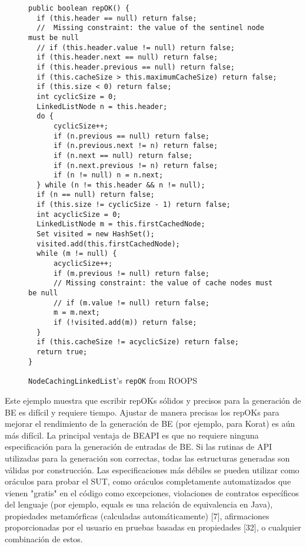 \begin{figure}[!thb]
\begin{lstlisting}
public boolean repOK() {
  if (this.header == null) return false;
  //  Missing constraint: the value of the sentinel node must be null  
  // if (this.header.value != null) return false;
  if (this.header.next == null) return false;
  if (this.header.previous == null) return false;
  if (this.cacheSize > this.maximumCacheSize) return false;
  if (this.size < 0) return false;
  int cyclicSize = 0;
  LinkedListNode n = this.header;
  do {
      cyclicSize++;
      if (n.previous == null) return false;
      if (n.previous.next != n) return false;
      if (n.next == null) return false;
      if (n.next.previous != n) return false;
      if (n != null) n = n.next;
  } while (n != this.header && n != null);
  if (n == null) return false;
  if (this.size != cyclicSize - 1) return false;
  int acyclicSize = 0;
  LinkedListNode m = this.firstCachedNode;
  Set visited = new HashSet();
  visited.add(this.firstCachedNode);
  while (m != null) {
      acyclicSize++;
      if (m.previous != null) return false;
      // Missing constraint: the value of cache nodes must be null
      // if (m.value != null) return false;
      m = m.next;
      if (!visited.add(m)) return false;
  }
  if (this.cacheSize != acyclicSize) return false;
  return true;
}
\end{lstlisting}
\caption{\texttt{NodeCachingLinkedList}'s \texttt{repOK} from \textsf{ROOPS}}
\label{fig:NCL-repOK}
\end{figure}

Este ejemplo muestra que escribir repOKs sólidos y precisos para la generación de BE es difícil y requiere tiempo. Ajustar de manera precisas los repOKs para mejorar el rendimiento de la generación de BE (por ejemplo, para Korat) es aún más difícil. La principal ventaja de BEAPI es que no requiere ninguna especificación para la generación de entradas de BE. Si las rutinas de API utilizadas para la generación son correctas, todas las estructuras generadas son válidas por construcción. Las especificaciones más débiles se pueden utilizar como oráculos para probar el SUT, como oráculos completamente automatizados que vienen "gratis" en el código como excepciones, violaciones de contratos específicos del lenguaje (por ejemplo, equals es una relación de equivalencia en Java), propiedades metamórficas (calculadas automáticamente) [7], afirmaciones proporcionadas por el usuario en pruebas basadas en propiedades [32], o cualquier combinación de estos.